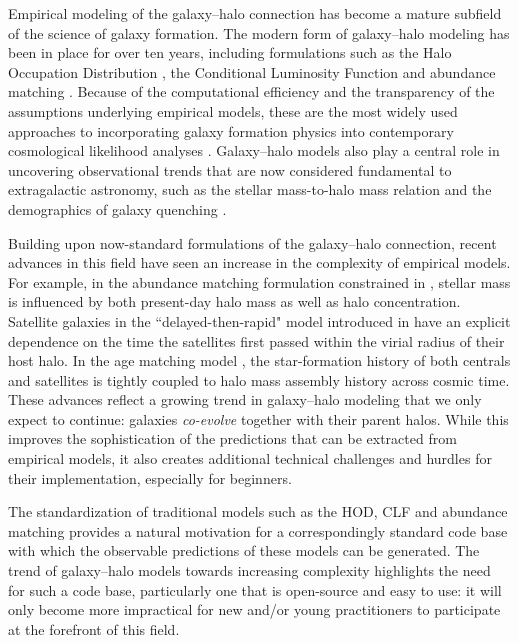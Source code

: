 \documentclass[twocolumn, tighten]{aastex6}
\begin{document}
Empirical modeling of the galaxy--halo connection has become a mature subfield of the science of galaxy formation. The modern form of galaxy--halo modeling has been in place for over ten years, including formulations such as the Halo Occupation Distribution \citep[HOD, ][]{berlind02}, the Conditional Luminosity Function \citep[CLF,][]{yang03} and abundance matching \citep{kravtsov04a}. Because of the computational efficiency and the transparency of the assumptions underlying empirical models, these are the most widely used approaches to incorporating galaxy formation physics into contemporary cosmological likelihood analyses \citep[e.g.,][]{cacciato_etal13, reid_etal14}. Galaxy--halo models also play a central role in uncovering observational trends that are now considered fundamental to extragalactic astronomy, such as the stellar mass-to-halo mass relation \citep{tinker05, vdBosch07, behroozi10, moster10, leauthaud_etal12} and the demographics of galaxy quenching \citep{vdBosch03a, collister05, behroozi13b, tinker_etal13}.

Building upon now-standard formulations of the galaxy--halo connection, recent advances in this field have seen an increase in the complexity of empirical models. For example, in the abundance matching formulation constrained in \citet{mao_etal15}, stellar mass is influenced by both present-day halo mass as well as halo concentration. Satellite galaxies in the ``delayed-then-rapid" model introduced in \citet{wetzel_etal12b} have an explicit dependence on the time the satellites first passed within the virial radius of their host halo. In the age matching model \citep{HW13a}, the star-formation history of both centrals and satellites is tightly coupled to halo mass assembly history across cosmic time. These advances reflect a growing trend in galaxy--halo modeling that we only expect to continue: galaxies {\em co-evolve} together with their parent halos. While this improves the sophistication of the predictions that can be extracted from empirical models, it also creates additional technical challenges and hurdles for their implementation, especially for beginners.

The standardization of traditional models such as the HOD, CLF and abundance matching provides a natural motivation for a correspondingly standard code base with which the observable predictions of these models can be generated. The trend of galaxy--halo models towards increasing complexity highlights the need for such a code base, particularly one that is open-source and easy to use: it will only become more impractical for new and/or young practitioners to participate at the forefront of this field. 
\end{document}
